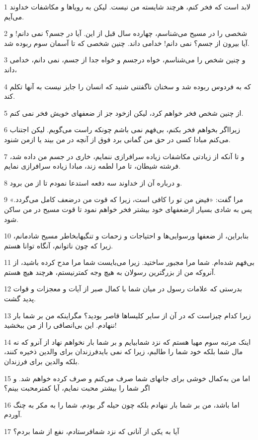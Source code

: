 \par 1 لابد است که فخر کنم، هرچند شایسته من نیست. لیکن به رویاها و مکاشفات خداوند می‌آیم.
\par 2 شخصی را در مسیح می‌شناسم، چهارده سال قبل از این. آیا در جسم؟ نمی دانم! و آیا بیرون از جسم؟ نمی دانم! خدامی داند. چنین شخصی که تا آسمان سوم ربوده شد.
\par 3 و چنین شخص را می‌شناسم، خواه درجسم و خواه جدا از جسم، نمی دانم، خدامی داند،
\par 4 که به فردوس ربوده شد و سخنان ناگفتنی شنید که انسان را جایز نیست به آنها تکلم کند.
\par 5 از چنین شخص فخر خواهم کرد، لیکن ازخود جز از ضعفهای خویش فخر نمی کنم.
\par 6 زیرااگر بخواهم فخر بکنم، بی‌فهم نمی باشم چونکه راست می‌گویم. لیکن اجتناب می‌کنم مبادا کسی در حق من گمانی برد فوق از آنچه در من بیند یا ازمن شنود.
\par 7 و تا آنکه از زیادتی مکاشفات زیاده سرافرازی ننمایم، خاری در جسم من داده شد، فرشته شیطان، تا مرا لطمه زند، مبادا زیاده سرافرازی نمایم.
\par 8 و درباره آن از خداوند سه دفعه استدعا نمودم تا از من برود.
\par 9 مرا گفت: «فیض من تو را کافی است، زیرا که قوت من درضعف کامل می‌گردد.» پس به شادی بسیار ازضعفهای خود بیشتر فخر خواهم نمود تا قوت مسیح در من ساکن شود.
\par 10 بنابراین، از ضعفها ورسوایی‌ها و احتیاجات و زحمات و تنگیهابخاطر مسیح شادمانم، زیرا که چون ناتوانم، آنگاه توانا هستم.
\par 11 بی‌فهم شده‌ام. شما مرا مجبور ساختید. زیرا می‌بایست شما مرا مدح کرده باشید، از آنروکه من از بزرگترین رسولان به هیچ وجه کمترنیستم، هرچند هیچ هستم.
\par 12 بدرستی که علامات رسول در میان شما با کمال صبر از آیات و معجزات و قوات پدید گشت.
\par 13 زیرا کدام چیزاست که در آن از سایر کلیساها قاصر بودید؟ مگراینکه من بر شما بار ننهادم. این بی‌انصافی را از من ببخشید!
\par 14 اینک مرتبه سوم مهیا هستم که نزد شمابیایم و بر شما بار نخواهم نهاد از آنرو که نه مال شما بلکه خود شما را طالبم، زیرا که نمی بایدفرزندان برای والدین ذخیره کنند، بلکه والدین برای فرزندان.
\par 15 اما من به‌کمال خوشی برای جانهای شما صرف می‌کنم و صرف کرده خواهم شد. و اگر شما را بیشتر محبت نمایم، آیا کمترمحبت بینم؟
\par 16 اما باشد، من بر شما بار ننهادم بلکه چون حیله گر بودم، شما را به مکر به چنگ آوردم.
\par 17 آیا به یکی از آنانی که نزد شمافرستادم، نفع از شما بردم؟

